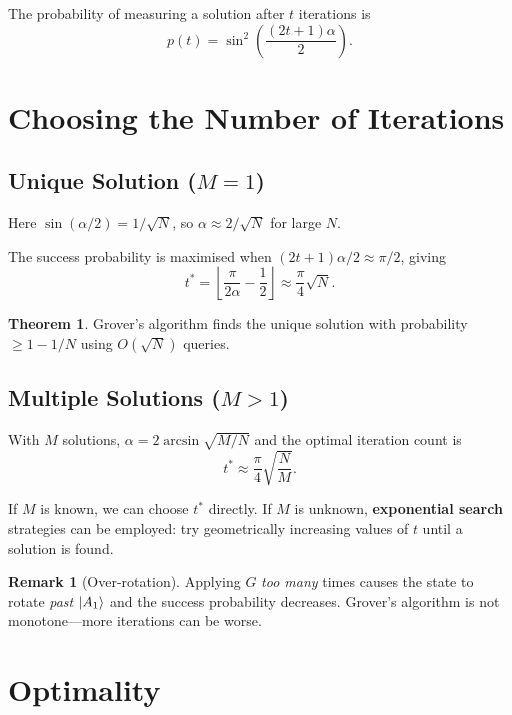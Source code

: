 \documentclass[11pt]{article}
\theoremstyle{definition}
\newtheorem{remark}{Remark}[section]
\newtheorem{theorem}{Theorem}[section]
\begin{document}
The probability of measuring a solution after $t$ iterations is
\[
    p(t) = \sin^2\!\left(\frac{(2t+1)\alpha}{2}\right).
\]

\section{Choosing the Number of Iterations}

\subsection{Unique Solution ($M=1$)}

Here $\sin(\alpha/2)=1/\sqrt{N}$, so $\alpha\approx 2/\sqrt{N}$ for large $N$.

The success probability is maximised when $(2t+1)\alpha/2\approx\pi/2$, giving
\[
    t^* = \left\lfloor\frac{\pi}{2\alpha}-\frac{1}{2}\right\rfloor
        \approx \frac{\pi}{4}\sqrt{N}.
\]

\begin{theorem}
Grover's algorithm finds the unique solution with probability $\ge 1-1/N$ using $O(\sqrt{N})$ queries.
\end{theorem}

\subsection{Multiple Solutions ($M>1$)}

With $M$ solutions, $\alpha = 2\arcsin\sqrt{M/N}$ and the optimal iteration count is
\[
    t^* \approx \frac{\pi}{4}\sqrt{\frac{N}{M}}.
\]

If $M$ is known, we can choose $t^*$ directly.  If $M$ is unknown, \textbf{exponential search} strategies can be employed: try geometrically increasing values of $t$ until a solution is found.

\begin{remark}[Over-rotation]
Applying $G$ \emph{too many} times causes the state to rotate \emph{past} $\ket{A_1}$ and the success probability decreases.  Grover's algorithm is not monotone---more iterations can be worse.
\end{remark}

\section{Optimality}
\end{document}

